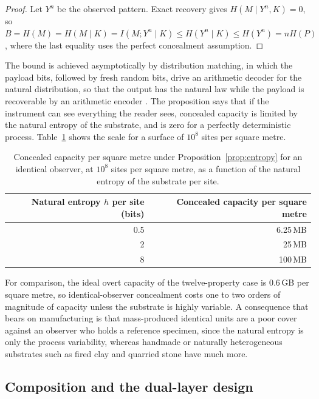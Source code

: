 \begin{proof}
Let $Y^{n}$ be the observed pattern. Exact recovery gives $H(M\mid Y^{n},K)=0$, so $B=H(M)=H(M\mid K)=I(M;Y^{n}\mid K)\le H(Y^{n}\mid K)\le H(Y^{n})=nH(P)$, where the last equality uses the perfect concealment assumption.
\end{proof}

The bound is achieved asymptotically by distribution matching, in which the payload bits, followed by fresh random bits, drive an arithmetic decoder for the natural distribution, so that the output has the natural law while the payload is recoverable by an arithmetic encoder \cite{cover2006}. The proposition says that if the instrument can see everything the reader sees, concealed capacity is limited by the natural entropy of the substrate, and is zero for a perfectly deterministic process. Table~\ref{tab:hidden} shows the scale for a surface of $10^{8}$ sites per square metre.

\begin{table}[h]
\centering
\small
\begin{tabular}{@{}rr@{}}
\toprule
Natural entropy $h$ per site (bits) & Concealed capacity per square metre \\
\midrule
0.5 & 6.25\,MB \\
2 & 25\,MB \\
8 & 100\,MB \\
\bottomrule
\end{tabular}
\caption{Concealed capacity per square metre under Proposition~\ref{prop:entropy} for an identical observer, at $10^{8}$ sites per square metre, as a function of the natural entropy of the substrate per site.}
\label{tab:hidden}
\end{table}

For comparison, the ideal overt capacity of the twelve-property case is $0.6$\,GB per square metre, so identical-observer concealment costs one to two orders of magnitude of capacity unless the substrate is highly variable. A consequence that bears on manufacturing is that mass-produced identical units are a poor cover against an observer who holds a reference specimen, since the natural entropy is only the process variability, whereas handmade or naturally heterogeneous substrates such as fired clay and quarried stone have much more.

\subsection{Composition and the dual-layer design}


